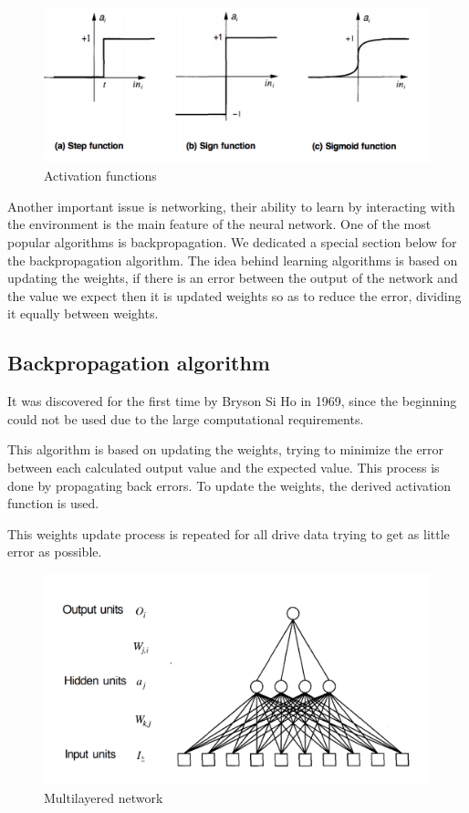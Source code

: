 \begin{figure}[htbp]
  \centerline{\includegraphics[scale=0.75]{fig/activation-fun.png}}  
  \caption{Activation functions \cite{book.neuronal.network.1995}}
  \label{fig:activation-fun}
\end{figure}
  Another important issue is networking,
   their ability to learn by interacting with the environment is the main feature of the neural network. 
   One of the most popular algorithms is backpropagation. 
   We dedicated a special section below for the backpropagation algorithm. The idea behind learning algorithms is based on updating the weights, 
   if there is an error between the output of the network and the value we expect then it is updated
   weights so as to reduce the error, dividing it equally between weights.
\subsection{Backpropagation algorithm}

It was discovered for the first time by Bryson Si Ho in 1969, 
since the beginning could not be used due to the large computational requirements. \cite{book.neuronal.network.1995}

This algorithm is based on updating the weights, trying to minimize the error between each calculated output value and the expected value. This process is done by propagating back errors.
 To update the weights, the derived activation function is used.

This weights update process is repeated for all drive data trying to get as little error as possible.


\begin{figure}[htbp]
  \centerline{\includegraphics[scale=0.45]{fig/neuronal-network-backpropagation.png}}  
  \caption{Multilayered network \cite{book.neuronal.network.1995}}
  \label{fig:neuronal-network-backpropagation}
\end{figure}


